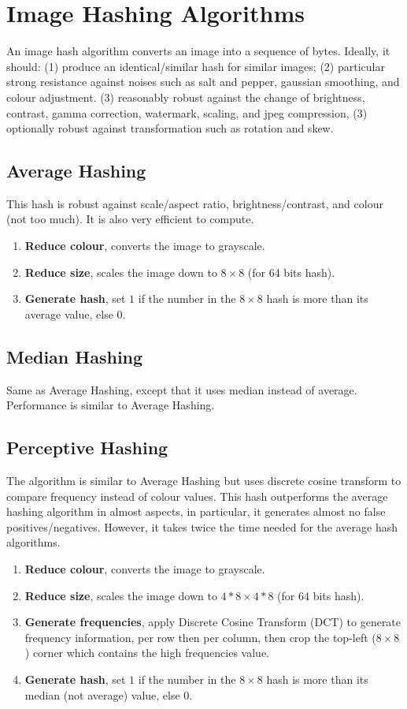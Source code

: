 \section{Image Hashing Algorithms}
\label{app:misc:image_hashing}
An image hash algorithm converts an image into a sequence of bytes. Ideally, it should: (1) produce an identical/similar hash for similar images; (2) particular strong resistance against noises such as salt and pepper, gaussian smoothing, and colour adjustment. (3) reasonably robust against the change of brightness, contrast, gamma correction, watermark, scaling, and jpeg compression, (3) optionally robust against transformation such as rotation and skew.

\subsection{Average Hashing}
This hash is robust against scale/aspect ratio, brightness/contrast, and colour (not too much). It is also very efficient to compute.
\begin{enumerate}
    \item \textbf{Reduce colour}, converts the image to grayscale.
    \item \textbf{Reduce size}, scales the image down to $8\times8$ (for 64 bits hash).
    \item \textbf{Generate hash}, set $1$ if the number in the $8\times8$ hash is more than its average value, else $0$.
\end{enumerate}

\subsection{Median Hashing}
Same as Average Hashing, except that it uses median instead of average. Performance is similar to Average Hashing.

\subsection{Perceptive Hashing}
The algorithm is similar to Average Hashing but uses discrete cosine transform to compare frequency instead of colour values. This hash outperforms the average hashing algorithm in almost aspects, in particular, it generates almost no false positives/negatives. However, it takes twice the time needed for the average hash algorithms.
\begin{enumerate}
    \item \textbf{Reduce colour}, converts the image to grayscale.
    \item \textbf{Reduce size}, scales the image down to $4*8 \times 4*8$ (for 64 bits hash).
    \item \textbf{Generate frequencies}, apply Discrete Cosine Transform (DCT) to generate frequency information, per row then per column, then crop the top-left ($8\times8$) corner which contains the high frequencies value.
    \item \textbf{Generate hash}, set $1$ if the number in the $8\times8$ hash is more than its median (not average) value, else $0$.
\end{enumerate}

